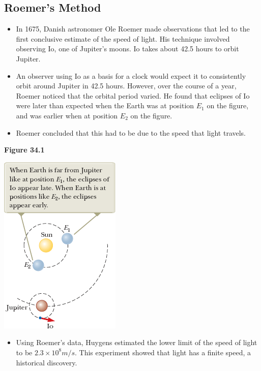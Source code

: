 \documentclass[12pt, letterpaper]{article}
\begin{document}
\subsection*{Roemer's Method}

\begin{itemize}
    \item In 1675, Danish astronomer Ole Roemer made observations that led to the first conclusive estimate of the speed of light. His technique involved observing Io, one of Jupiter's moons. Io takes about 42.5 hours to orbit Jupiter.
    \item An observer using Io as a basis for a clock would expect it to consistently orbit around Jupiter in 42.5 hours. However, over the course of a year, Roemer noticed that the orbital period varied. He found that eclipses of Io were later than expected when the Earth was at position $E_{1}$ on the figure, and was earlier when at position $E_{2}$ on the figure.
    \item Roemer concluded that this had to be due to the speed that light travels.
\end{itemize}

\large \textbf{Figure 34.1}

\begin{center}
    \includegraphics{roemer.png}
\end{center}

\begin{itemize}
    \item \normalsize Using Roemer's data, Huygens estimated the lower limit of the speed of light to be $2.3 \times 10^{8}m/s$. This experiment showed that light has a finite speed, a historical discovery.
\end{itemize}
\end{document}
